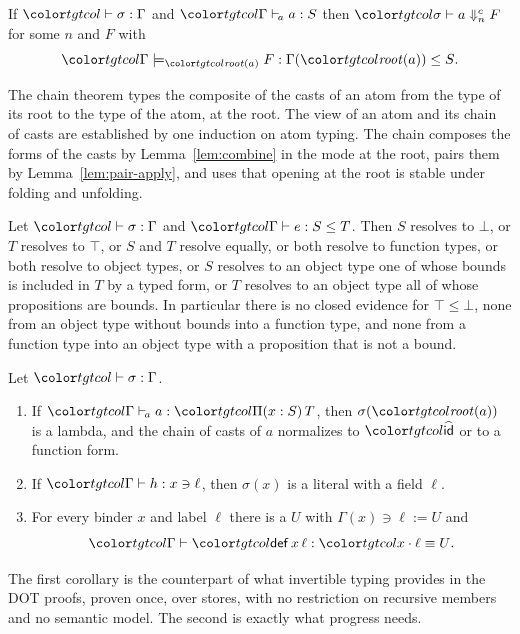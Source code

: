 \begin{theorem}\label{thm:chain}
If $\storej{\sigma}{\Gamma}$ and $\atomj{\Gamma}{a}{S}$ then $\chn{\sigma}{a}{n}{F}$ for some $n$ and $F$ with
\[ \chainj{\Gamma}{\rt{a}}{F}{\Gamma(\rt{a})}{S} . \]
\end{theorem}

The chain theorem types the composite of the casts of an atom from the type of its root to the type of the atom, at the root. The view of an atom and its chain of casts are established by one induction on atom typing. The chain composes the forms of the casts by Lemma~\ref{lem:combine} in the mode at the root, pairs them by Lemma~\ref{lem:pair-apply}, and uses that opening at the root is stable under folding and unfolding.

\begin{corollary}\label{cor:shapes}
Let $\storej{\sigma}{\Gamma}$ and $\lej{\Gamma}{e}{S}{T}$. Then $S$ resolves to $\bot$, or $T$ resolves to $\top$, or $S$ and $T$ resolve equally, or both resolve to function types, or both resolve to object types, or $S$ resolves to an object type one of whose bounds is included in $T$ by a typed form, or $T$ resolves to an object type all of whose propositions are bounds. In particular there is no closed evidence for $\top \le \bot$, none from an object type without bounds into a function type, and none from a function type into an object type with a proposition that is not a bound.
\end{corollary}

\begin{corollary}\label{cor:inversion}
Let $\storej{\sigma}{\Gamma}$.
\begin{enumerate}
\item If $\atomj{\Gamma}{a}{\pit{S}{T}}$, then $\sigma(\rt{a})$ is a lambda, and the chain of casts of $a$ normalizes to $\form{id}$ or to a function form.
\item If $\hasj{\Gamma}{h}{x}{\ell}$, then $\sigma(x)$ is a literal with a field $\ell$.
\item For every binder $x$ and label $\ell$ there is a $U$ with $\Gamma(x) \ni \ell \mathrel{:=} U$ and
\[ \eqj{\Gamma}{\ev{def}\,x\,\ell}{\sel{x}{\ell}}{U} . \]
\end{enumerate}
\end{corollary}

The first corollary is the counterpart of what invertible typing provides in the DOT proofs, proven once, over stores, with no restriction on recursive members and no semantic model. The second is exactly what progress needs.
